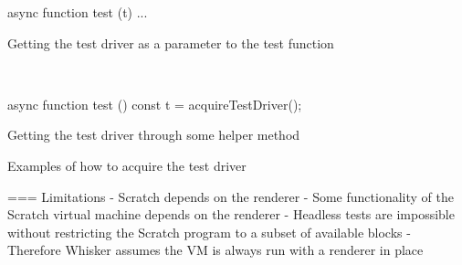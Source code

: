 \begin{listing}[ht]
    \centering
    \begin{minipage}[t]{.45\textwidth}
        \begin{javascriptcode}
            async function test (t) {
                ...
            }
        \end{javascriptcode}
        \vspace{-\bigskipamount}
        Getting the test driver as a parameter to the test function
    \end{minipage}
    ~
    \begin{minipage}[t]{.45\textwidth}
        \begin{javascriptcode}
            async function test () {
                const t = acquireTestDriver();
            }
        \end{javascriptcode}
        \vspace{-\bigskipamount}
        Getting the test driver through some helper method
    \end{minipage}
    \caption{Examples of how to acquire the test driver}
    \label{fig:examples_of_how_to_acquire_the_test_driver}
\end{listing}

=== Limitations
- Scratch depends on the renderer
    - Some functionality of the Scratch virtual machine depends on the renderer
    - Headless tests are impossible without restricting the Scratch program to a subset of available blocks
- Therefore Whisker assumes the VM is always run with a renderer in place


